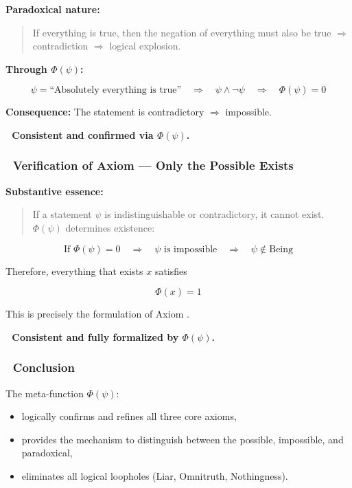 \documentclass[12pt]{article}
\begin{document}
\textbf{Paradoxical nature:}

\begin{quote}
If everything is true, then the negation of everything must also be true $\Rightarrow$ contradiction $\Rightarrow$ logical explosion.
\end{quote}

\textbf{Through $\Phi(\psi)$:}

\[
\psi = \text{``Absolutely everything is true''}
\quad \Rightarrow \quad 
\psi \wedge \neg \psi 
\quad \Rightarrow \quad 
\Phi(\psi) = 0
\]

\textbf{Consequence:} The statement is contradictory $\Rightarrow$ impossible.

\textbf{🔹 Consistent and confirmed via $\Phi(\psi)$.}

\subsubsection*{🔹 Verification of Axiom \text{[3]} — Only the Possible Exists}

\textbf{Substantive essence:}

\begin{quote}
If a statement $\psi$ is indistinguishable or contradictory, it cannot exist. 
$\Phi(\psi)$ determines existence:
\end{quote}

\[
\text{If } \Phi(\psi) = 0 \quad \Rightarrow \quad \psi \text{ is impossible} \quad \Rightarrow \quad \psi \notin \text{Being}
\]

Therefore, everything that exists $x$ satisfies 

\[
\Phi(x) = 1
\]

This is precisely the formulation of Axiom \text{[3]}.

\textbf{🔹 Consistent and fully formalized by $\Phi(\psi)$.}

\subsubsection*{🔹 Conclusion}

The meta-function $\Phi(\psi)$:

\begin{itemize}
\item logically confirms and refines all three core axioms,
\item provides the mechanism to distinguish between the possible, impossible, and paradoxical,
\item eliminates all logical loopholes (Liar, Omnitruth, Nothingness).
\end{itemize}
\end{document}
